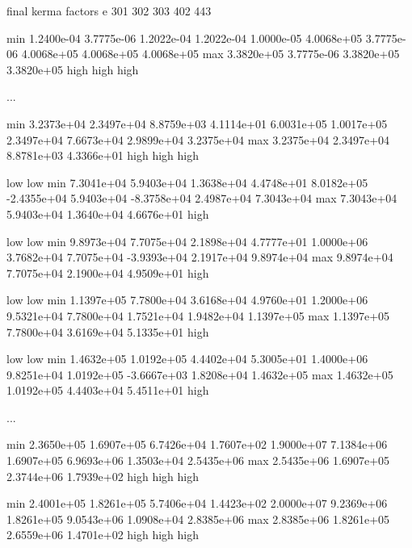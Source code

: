 \newpage
\small
\begin{ccode}

final kerma factors
          e          301          302          303          402          443

        min   1.2400e-04   3.7775e-06   1.2022e-04   1.2022e-04
 1.0000e-05   4.0068e+05   3.7775e-06   4.0068e+05   4.0068e+05   4.0068e+05
        max   3.3820e+05   3.7775e-06   3.3820e+05   3.3820e+05
                high                      high         high

  ...

        min   3.2373e+04   2.3497e+04   8.8759e+03   4.1114e+01
 6.0031e+05   1.0017e+05   2.3497e+04   7.6673e+04   2.9899e+04   3.2375e+04
        max   3.2375e+04   2.3497e+04   8.8781e+03   4.3366e+01
                high                      high         high

                 low                       low
        min   7.3041e+04   5.9403e+04   1.3638e+04   4.4748e+01
 8.0182e+05  -2.4355e+04   5.9403e+04  -8.3758e+04   2.4987e+04   7.3043e+04
        max   7.3043e+04   5.9403e+04   1.3640e+04   4.6676e+01
                                                        high

                low                       low
        min   9.8973e+04   7.7075e+04   2.1898e+04   4.7777e+01
 1.0000e+06   3.7682e+04   7.7075e+04  -3.9393e+04   2.1917e+04   9.8974e+04
        max   9.8974e+04   7.7075e+04   2.1900e+04   4.9509e+01
                                                        high

                low                       low
        min   1.1397e+05   7.7800e+04   3.6168e+04   4.9760e+01
 1.2000e+06   9.5321e+04   7.7800e+04   1.7521e+04   1.9482e+04   1.1397e+05
        max   1.1397e+05   7.7800e+04   3.6169e+04   5.1335e+01
                                                        high

                low                       low
        min   1.4632e+05   1.0192e+05   4.4402e+04   5.3005e+01
 1.4000e+06   9.8251e+04   1.0192e+05  -3.6667e+03   1.8208e+04   1.4632e+05
        max   1.4632e+05   1.0192e+05   4.4403e+04   5.4511e+01
                                                        high

  ...

        min   2.3650e+05   1.6907e+05   6.7426e+04   1.7607e+02
 1.9000e+07   7.1384e+06   1.6907e+05   6.9693e+06   1.3503e+04   2.5435e+06
        max   2.5435e+06   1.6907e+05   2.3744e+06   1.7939e+02
                high                      high         high

        min   2.4001e+05   1.8261e+05   5.7406e+04   1.4423e+02
 2.0000e+07   9.2369e+06   1.8261e+05   9.0543e+06   1.0908e+04   2.8385e+06
        max   2.8385e+06   1.8261e+05   2.6559e+06   1.4701e+02
                high                      high         high

\end{ccode}
\normalsize

